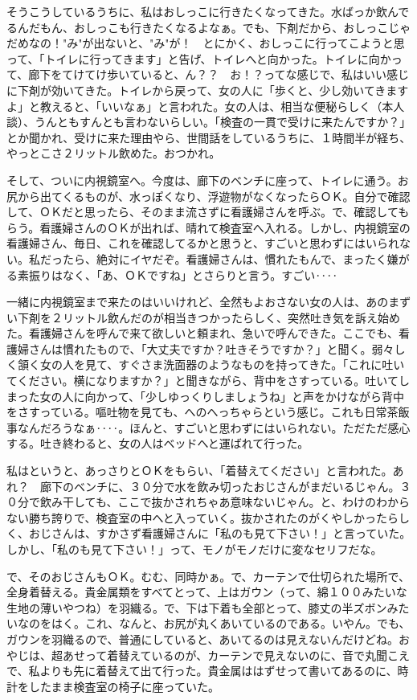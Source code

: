 そうこうしているうちに、私はおしっこに行きたくなってきた。水ばっか飲んでるんだもん、おしっこも行きたくなるよなぁ。でも、下剤だから、おしっこじゃだめなの！"み"が出ないと、"み"が！　とにかく、おしっこに行ってこようと思って、「トイレに行ってきます」と告げ、トイレへと向かった。トイレに向かって、廊下をてけてけ歩いていると、ん？？　お！？ってな感じで、私はいい感じに下剤が効いてきた。トイレから戻って、女の人に「歩くと、少し効いてきますよ」と教えると、「いいなぁ」と言われた。女の人は、相当な便秘らしく（本人談）、うんともすんとも言わないらしい。「検査の一貫で受けに来たんですか？」とか聞かれ、受けに来た理由やら、世間話をしているうちに、１時間半が経ち、やっとこさ２リットル飲めた。おつかれ。

そして、ついに内視鏡室へ。今度は、廊下のベンチに座って、トイレに通う。お尻から出てくるものが、水っぽくなり、浮遊物がなくなったらＯＫ。自分で確認して、ＯＫだと思ったら、そのまま流さずに看護婦さんを呼ぶ。で、確認してもらう。看護婦さんのＯＫが出れば、晴れて検査室へ入れる。しかし、内視鏡室の看護婦さん、毎日、これを確認してるかと思うと、すごいと思わずにはいられない。私だったら、絶対にイヤだぞ。看護婦さんは、慣れたもんで、まったく嫌がる素振りはなく、「あ、ＯＫですね」とさらりと言う。すごい‥‥

一緒に内視鏡室まで来たのはいいけれど、全然もよおさない女の人は、あのまずい下剤を２リットル飲んだのが相当きつかったらしく、突然吐き気を訴え始めた。看護婦さんを呼んで来て欲しいと頼まれ、急いで呼んできた。ここでも、看護婦さんは慣れたもので、「大丈夫ですか？吐きそうですか？」と聞く。弱々しく頷く女の人を見て、すぐさま洗面器のようなものを持ってきた。「これに吐いてください。横になりますか？」と聞きながら、背中をさすっている。吐いてしまった女の人に向かって、「少しゆっくりしましょうね」と声をかけながら背中をさすっている。嘔吐物を見ても、へのへっちゃらという感じ。これも日常茶飯事なんだろうなぁ‥‥。ほんと、すごいと思わずにはいられない。ただただ感心する。吐き終わると、女の人はベッドへと運ばれて行った。

私はというと、あっさりとＯＫをもらい、「着替えてください」と言われた。あれ？　廊下のベンチに、３０分で水を飲み切ったおじさんがまだいるじゃん。３０分で飲み干しても、ここで抜かされちゃあ意味ないじゃん。と、わけのわからない勝ち誇りで、検査室の中へと入っていく。抜かされたのがくやしかったらしく、おじさんは、すかさず看護婦さんに「私のも見て下さい！」と言っていた。しかし、「私のも見て下さい！」って、モノがモノだけに変なセリフだな。

で、そのおじさんもＯＫ。むむ、同時かぁ。で、カーテンで仕切られた場所で、全身着替える。貴金属類をすべてとって、上はガウン（って、綿１００みたいな生地の薄いやつね）を羽織る。で、下は下着も全部とって、膝丈の半ズボンみたいなのをはく。これ、なんと、お尻が丸くあいているのである。いやん。でも、ガウンを羽織るので、普通にしていると、あいてるのは見えないんだけどね。おやじは、超あせって着替えているのが、カーテンで見えないのに、音で丸聞こえで、私よりも先に着替えて出て行った。貴金属ははずせって書いてあるのに、時計をしたまま検査室の椅子に座っていた。

